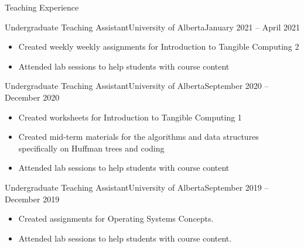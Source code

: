 \documentclass[]{mcdowellcv}
\begin{document}
\vspace*{-10pt}
\begin{cvsection}{Teaching Experience}
  \begin{cvsubsection}{Undergraduate Teaching Assistant}{University of Alberta}{January 2021 -- April 2021}	
    \vspace*{8pt}
    \begin{itemize}
      \item Created weekly weekly assignments for Introduction to Tangible Computing 2 
      \item Attended lab sessions to help students with course content
    \end{itemize}
  \end{cvsubsection}

  \begin{cvsubsection}{Undergraduate Teaching Assistant}{University of Alberta}{September 2020 -- December 2020}	
    \vspace*{8pt}
    \begin{itemize}
      \item Created worksheets for Introduction to Tangible Computing 1 
      \item Created mid-term materials for the algorithms and data structures specifically on Huffman trees and coding 
      \item Attended lab sessions to help students with course content
    \end{itemize}
  \end{cvsubsection}
  
  \begin{cvsubsection}{Undergraduate Teaching Assistant}{University of Alberta}{September 2019 -- December 2019}	
    \vspace*{8pt}
    \begin{itemize}
      \item Created assignments for Operating Systems Concepts. 
      \item Attended lab sessions to help students with course content.
    \end{itemize}
  \end{cvsubsection}
  
\end{cvsection}
\end{document}
